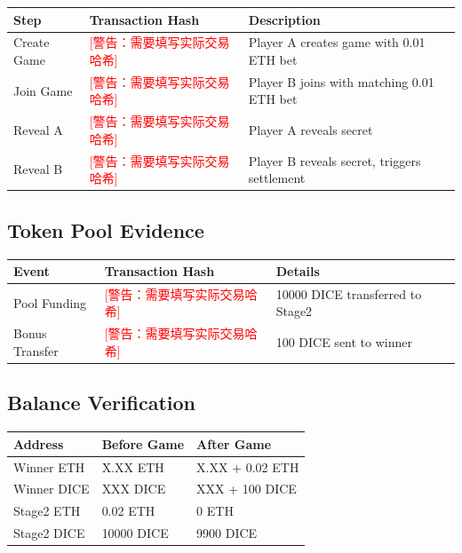\documentclass[10pt,a4paper]{article}
\begin{document}
\begin{table}[h]
\centering
\begin{tabularx}{\textwidth}{l X X}
\toprule
\textbf{Step} & \textbf{Transaction Hash} & \textbf{Description} \\
\midrule
Create Game & \textcolor{red}{[警告：需要填写实际交易哈希]} & Player A creates game with 0.01 ETH bet \\
Join Game & \textcolor{red}{[警告：需要填写实际交易哈希]} & Player B joins with matching 0.01 ETH bet \\
Reveal A & \textcolor{red}{[警告：需要填写实际交易哈希]} & Player A reveals secret \\
Reveal B & \textcolor{red}{[警告：需要填写实际交易哈希]} & Player B reveals secret, triggers settlement \\
\bottomrule
\end{tabularx}
\end{table}

\subsection*{Token Pool Evidence}

\begin{table}[h]
\centering
\begin{tabularx}{\textwidth}{l X X}
\toprule
\textbf{Event} & \textbf{Transaction Hash} & \textbf{Details} \\
\midrule
Pool Funding & \textcolor{red}{[警告：需要填写实际交易哈希]} & 10000 DICE transferred to Stage2 \\
Bonus Transfer & \textcolor{red}{[警告：需要填写实际交易哈希]} & 100 DICE sent to winner \\
\bottomrule
\end{tabularx}
\end{table}

\subsection*{Balance Verification}

\begin{table}[h]
\centering
\begin{tabularx}{\textwidth}{X X X}
\toprule
\textbf{Address} & \textbf{Before Game} & \textbf{After Game} \\
\midrule
Winner ETH & X.XX ETH & X.XX + 0.02 ETH \\
Winner DICE & XXX DICE & XXX + 100 DICE \\
Stage2 ETH & 0.02 ETH & 0 ETH \\
Stage2 DICE & 10000 DICE & 9900 DICE \\
\bottomrule
\end{tabularx}
\end{table}
\end{document}

